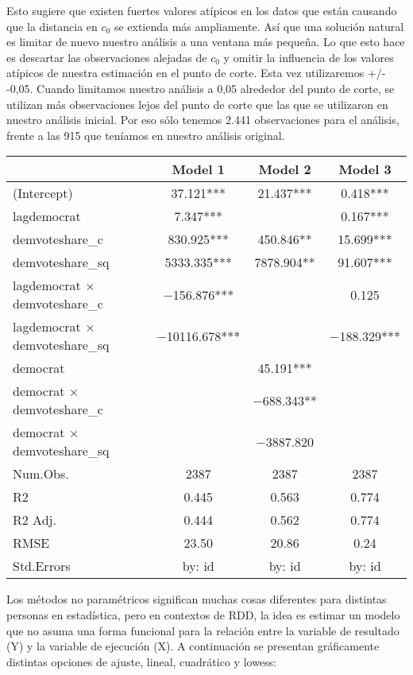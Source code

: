 \documentclass[
]{article}
\begin{document}
Esto sugiere que existen fuertes valores atípicos en los datos que están
causando que la distancia en \(c_0\) se extienda más ampliamente. Así
que una solución natural es limitar de nuevo nuestro análisis a una
ventana más pequeña. Lo que esto hace es descartar las observaciones
alejadas de \(c_0\) y omitir la influencia de los valores atípicos de
nuestra estimación en el punto de corte. Esta vez utilizaremos +/-
-0,05. Cuando limitamos nuestro análisis a 0,05 alrededor del punto de
corte, se utilizan más observaciones lejos del punto de corte que las
que se utilizaron en nuestro análisis inicial. Por eso sólo tenemos
2.441 observaciones para el análisis, frente a las 915 que teníamos en
nuestro análisis original.

\begin{table}
\centering
\begin{tabular}[t]{lccc}
\toprule
  & Model 1 & Model 2 & Model 3\\
\midrule
(Intercept) & \num{37.121}*** & \num{21.437}*** & \num{0.418}***\\
lagdemocrat & \num{7.347}*** &  & \num{0.167}***\\
demvoteshare\_c & \num{830.925}*** & \num{450.846}** & \num{15.699}***\\
demvoteshare\_sq & \num{5333.335}*** & \num{7878.904}** & \num{91.607}***\\
lagdemocrat × demvoteshare\_c & \num{-156.876}*** &  & \num{0.125}\\
lagdemocrat × demvoteshare\_sq & \num{-10116.678}*** &  & \num{-188.329}***\\
democrat &  & \num{45.191}*** & \\
democrat × demvoteshare\_c &  & \num{-688.343}** & \\
democrat × demvoteshare\_sq &  & \num{-3887.820} & \\
\midrule
Num.Obs. & \num{2387} & \num{2387} & \num{2387}\\
R2 & \num{0.445} & \num{0.563} & \num{0.774}\\
R2 Adj. & \num{0.444} & \num{0.562} & \num{0.774}\\
RMSE & \num{23.50} & \num{20.86} & \num{0.24}\\
Std.Errors & by: id & by: id & by: id\\
\bottomrule
\end{tabular}
\end{table}

Los métodos no paramétricos significan muchas cosas diferentes para
distintas personas en estadística, pero en contextos de RDD, la idea es
estimar un modelo que no asuma una forma funcional para la relación
entre la variable de resultado (Y) y la variable de ejecución (X). A
continuación se presentan gráficamente distintas opciones de ajuste,
lineal, cuadrático y lowess:
\end{document}

